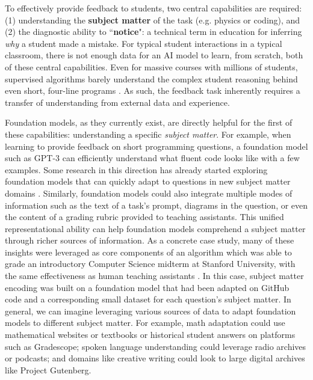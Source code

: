 To effectively provide feedback to students, two central capabilities are required: (1) understanding the \textbf{subject matter} of the task (e.g. physics or coding), and (2) the diagnostic ability to ``\textbf{notice}": a technical term in education for inferring \emph{why} a student made a mistake. For typical student interactions in a typical classroom, there is not enough data for an AI model to learn, from scratch, both of these central capabilities. Even for massive courses with millions of students, supervised algorithms barely understand the complex student reasoning behind even short, four-line programs \citep{malik2021generative}. As such, the feedback task inherently requires a transfer of understanding from external data and experience.

Foundation models, as they currently exist, are directly helpful for the first of these capabilities: understanding a specific \emph{subject matter}. For example, when learning to provide feedback on short programming questions, a foundation model such as GPT-3 can efficiently understand what fluent code looks like with a few examples. Some research in this direction has already started exploring foundation models that can quickly adapt to questions in new subject matter domains \cite{wu2021prototransf, condor2021sbert}. Similarly, foundation models could also integrate multiple modes of information such as the text of a task's prompt, diagrams in the question, or even the content of a grading rubric provided to teaching assistants. This unified representational ability can help foundation models comprehend a subject matter through richer sources of information. As a concrete case study, many of these insights were leveraged as core components of an algorithm which was able to grade an introductory Computer Science midterm at Stanford University, with the same effectiveness as human teaching assistants \citep{wu2021prototransf}. In this case, subject matter encoding was built on a foundation model that had been adapted on GitHub code and a corresponding small dataset for each question's subject matter. In general, we can imagine leveraging various sources of data to adapt foundation models to different subject matter. For example, math adaptation could use mathematical websites or textbooks \cite{shen2021mathbert} or  historical student answers on platforms such as Gradescope; spoken language understanding could leverage radio archives or podcasts; and domains like creative writing could look to large digital archives like Project Gutenberg.

